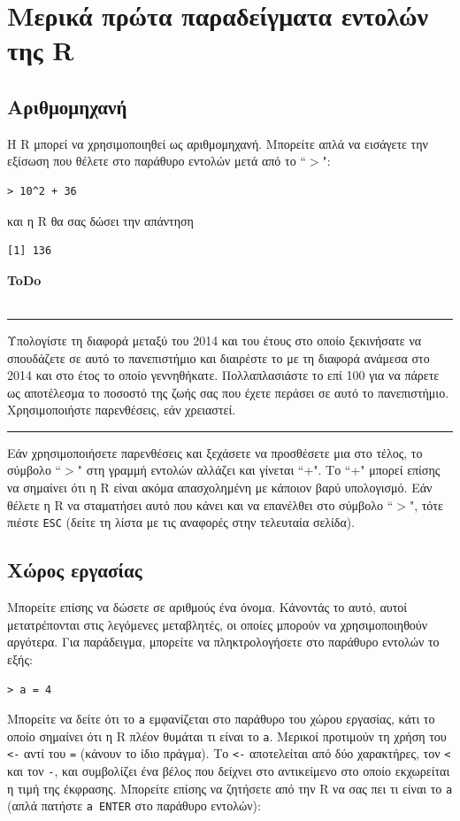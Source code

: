 \documentclass[a4paper,10pt,twocolumn]{article}
\makeatletter
\newenvironment{ToDo} {
  \begin{flushright}
    \hfill
    \begin{minipage}{0.9\columnwidth}
    \textsf{\textbf{ToDo}} \\
      \vspace{-0.7cm}\\
      {\color{Gray}\rule[-0.05cm]{\columnwidth}{1.5pt}}} {
      {\color{Gray}\rule[0.3cm]{\columnwidth}{1.5pt}}
    \end{minipage}
    \vspace{0.3cm}
  \end{flushright}
  }
\let\SF@@footnote\footnote
\def\footnote{\ifx\protect\@typeset@protect
 \expandafter\SF@@footnote
 \else
 \expandafter\SF@gobble@opt
 \fi
}
\edef\SF@gobble@opt{\noexpand\protect
 \expandafter\noexpand\csname SF@gobble@opt \endcsname}
\makeatother
\begin{document}
\section{Μερικά πρώτα παραδείγματα εντολών της R}

\subsection{Αριθμομηχανή}

Η R μπορεί να χρησιμοποιηθεί ως αριθμομηχανή. Μπορείτε απλά να εισάγετε την εξίσωση που θέλετε στο
παράθυρο εντολών μετά από το ``$>$":
\begin{Verbatim}[frame=single,gobble=0]
> 10^2 + 36
\end{Verbatim}
και η R θα σας δώσει την απάντηση
\begin{Verbatim}[frame=single,gobble=0]
[1] 136
\end{Verbatim}

\begin{ToDo}
Υπολογίστε τη διαφορά μεταξύ του 2014 και του έτους στο οποίο ξεκινήσατε να σπουδάζετε σε αυτό το πανεπιστήμιο
και διαιρέστε το με τη διαφορά ανάμεσα στο 2014 και στο έτος το οποίο γεννηθήκατε. Πολλαπλασιάστε το επί 100 για
να πάρετε ως αποτέλεσμα το ποσοστό της ζωής σας που έχετε περάσει σε αυτό το πανεπιστήμιο. Χρησιμοποιήστε
παρενθέσεις, εάν χρειαστεί. \\
\end{ToDo}

Εάν χρησιμοποιήσετε παρενθέσεις και ξεχάσετε να προσθέσετε μια στο τέλος, το σύμβολο ``$>$" στη γραμμή
εντολών αλλάζει και γίνεται ``+". Το ``+" μπορεί επίσης να σημαίνει ότι η R είναι ακόμα απασχολημένη με 
κάποιον βαρύ υπολογισμό. Εάν θέλετε η R να σταματήσει αυτό που κάνει και να επανέλθει στο σύμβολο ``$>$", 
τότε πιέστε \texttt{ESC} (δείτε τη λίστα με τις αναφορές στην τελευταία σελίδα). 

\subsection{Χώρος εργασίας}

Μπορείτε επίσης να δώσετε σε αριθμούς ένα όνομα. Κάνοντάς το αυτό, αυτοί μετατρέπονται στις λεγόμενες
μεταβλητές, οι οποίες μπορούν να χρησιμοποιηθούν αργότερα. Για παράδειγμα, μπορείτε να πληκτρολογήσετε στο
παράθυρο εντολών το εξής: 
\begin{Verbatim}[frame=single,gobble=0]
> a = 4
\end{Verbatim}
Μπορείτε να δείτε ότι το \texttt{a} εμφανίζεται στο παράθυρο του χώρου εργασίας, κάτι το οποίο σημαίνει ότι η
R πλέον θυμάται τι είναι το \texttt{a}.\footnote{Μερικοί προτιμούν τη χρήση του \texttt{<-} αντί του
\texttt{=} (κάνουν το ίδιο πράγμα). Το \texttt{<-} αποτελείται από δύο χαρακτήρες, τον \texttt{<} και τον
\texttt{-}, και συμβολίζει ένα βέλος που δείχνει στο αντικείμενο στο οποίο εκχωρείται η τιμή της έκφρασης.} 
Μπορείτε επίσης να ζητήσετε από την R να σας πει τι είναι το \texttt{a} (απλά πατήστε \texttt{a ENTER} στο
παράθυρο εντολών):
\end{document}
